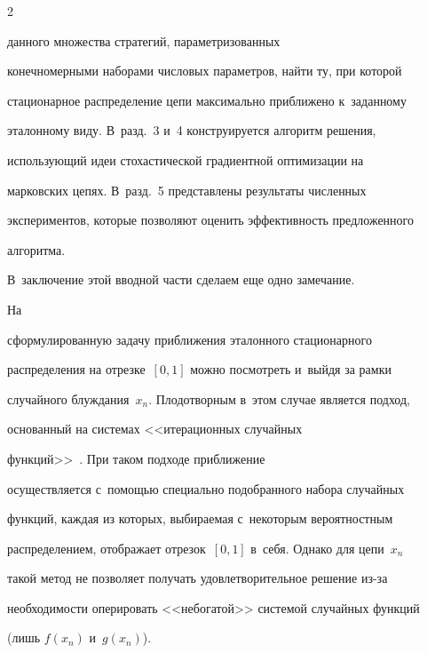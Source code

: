 \begin{multicols}{2}
\columnbreak





\noindent


данного множества стратегий, па\-ра\-мет\-ри\-зо\-ван\-ных 


конечномерными наборами чис\-ло\-вых па\-ра\-мет\-ров, найти ту, при которой 


стационарное распределение цепи максимально приближено к~заданному 


эталонному виду. В~разд.~3 и~4 конструируется алгоритм решения, 


использующий идеи стохастической градиентной оптимизации на 


марковских цепях. В~разд.~5 пред\-став\-ле\-ны результаты чис\-лен\-ных 


экспериментов, которые позволяют оценить эффективность предложенного 


алгоритма.


  


  В~заключение этой вводной час\-ти сделаем еще одно замечание. 


  


  На 


сформулированную задачу приближения эталонного стационарного 


распределения на отрезке~$[0,1]$ мож\-но посмотреть и~выйдя за рамки 


случайного блуж\-да\-ния~$x_n$. Плодотворным в~этом случае является подход, 


основанный на сис\-те\-мах <<итерационных случайных  


функций>>~\cite{8-kr, 12-kr, 13-kr}. При таком подходе при\-бли\-же\-ние 


осуществляется с~по\-мощью специально подобранного набора случайных 


функций, каждая из которых, выбираемая с~некоторым вероятностным 


распределением, отображает отрезок~$[0,1]$ в~себя. Однако для цепи~$x_n$ 


такой метод не позволяет получать удовлетворительное решение из-за 


необходимости оперировать <<небогатой>> сис\-те\-мой случайных функций 


(лишь $f(x_n)$ и~$g(x_n)$).


{





}
\end{multicols}
